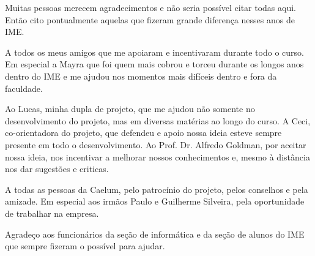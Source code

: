 \documentclass[titlepage,a4paper]{article}
\begin{document}
Muitas pessoas merecem agradecimentos e não seria possível citar todas aqui. Então cito pontualmente aquelas que fizeram grande diferença nesses anos de IME.

A todos os meus amigos que me apoiaram e incentivaram durante todo o curso. Em especial a Mayra que foi quem mais cobrou e torceu durante os longos anos dentro do IME e me ajudou nos momentos mais difíceis dentro e fora da faculdade.

Ao Lucas, minha dupla de projeto, que me ajudou não somente no desenvolvimento do projeto, mas em diversas matérias ao longo do curso. A Ceci, co-orientadora do projeto, que defendeu e apoio nossa ideia esteve sempre presente em todo o desenvolvimento. Ao Prof. Dr. Alfredo Goldman, por aceitar nossa ideia, nos incentivar a melhorar nossos conhecimentos e, mesmo à distância nos dar sugestões e criticas.

A todas as pessoas da Caelum, pelo patrocínio do projeto, pelos conselhos e pela amizade. Em especial aos irmãos Paulo e Guilherme Silveira, pela oportunidade de trabalhar na empresa. 

Agradeço aos funcionários da seção de informática e da seção de alunos do IME que sempre fizeram o possível para ajudar.
\end{document}
